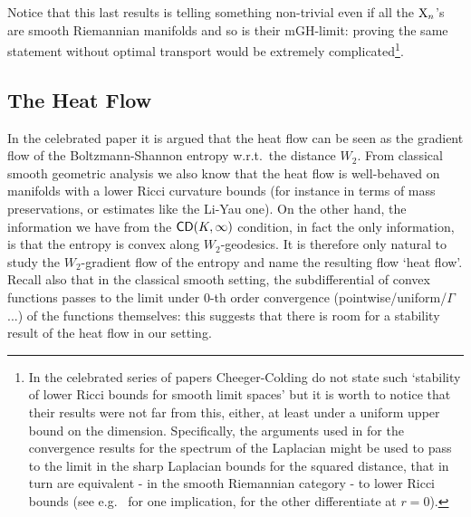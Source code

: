 \documentclass[11pt]{article}
\numberwithin{equation}{section}
\newcommand{\X}{{\rm X}}
\newcommand{\CD}{{\sf CD}}
\begin{document}
Notice that this last results is telling something non-trivial even if all the $\X_n$'s are smooth Riemannian manifolds and so is their mGH-limit: proving the same statement without optimal transport would be extremely complicated\footnote{In the celebrated series of papers \cite{Cheeger-Colding97I,Cheeger-Colding97II,Cheeger-Colding97III} Cheeger-Colding do not state such `stability of lower Ricci bounds for smooth limit spaces' but it is worth to notice that their results were not far from this, either, at least under a uniform upper bound on the dimension. Specifically,  the arguments used in \cite{Cheeger-Colding97III} for the convergence results for the spectrum of the Laplacian might be used to pass to the limit in the sharp Laplacian bounds for the squared distance, that in turn are equivalent - in the smooth Riemannian category - to lower Ricci bounds (see e.g.\ \cite[Theorem 3.6]{Wei07} for one implication, for the other differentiate \cite[Inequalities (3.4),(3.5)]{Wei07} at $r=0$).}.






\subsection{The Heat Flow}\label{se:hf}
In the celebrated paper \cite{JKO98} it is argued that the heat flow can be seen as the gradient flow of the Boltzmann-Shannon entropy w.r.t.\ the distance $W_2$. From classical smooth geometric analysis we also know that the heat flow is well-behaved on manifolds with a lower Ricci curvature bounds (for instance in terms of mass preservations, or estimates like the Li-Yau one). On the other hand, the information we have from the $\CD(K,\infty)$ condition, in fact the only information, is that the entropy is convex along $W_2$-geodesics. It is therefore only natural to study the $W_2$-gradient flow of the entropy and name the resulting flow `heat flow'. Recall also that in the classical smooth setting, the subdifferential of convex functions passes to the limit under 0-th order convergence (pointwise/uniform/$\Gamma$...) of the functions themselves: this suggests that there is room for a stability result of the heat flow in our setting.

\medskip
\end{document}
